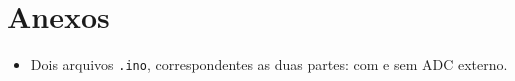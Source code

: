 \documentclass[a4paper,oneside,10pt]{article}
\begin{document}
\section{Anexos}

\begin{itemize}
	\item Dois arquivos \texttt{.ino}, correspondentes as duas partes: com e sem ADC externo.
\end{itemize}

\newpage



\end{document}
